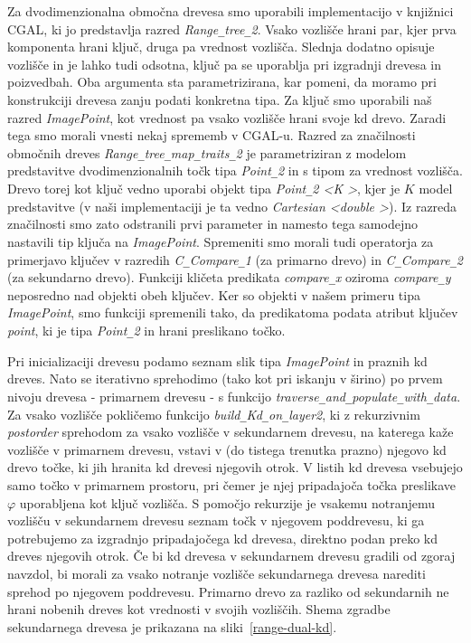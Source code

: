 \documentclass[a4paper, 12pt]{book}
\newcommand{\U}{\texttt{\_}}
\begin{document}
Za dvodimenzionalna območna drevesa smo uporabili implementacijo v knjiž\-ni\-ci CGAL, ki jo predstavlja razred \textit{Range\texttt{\_}tree\texttt{\_}2}. Vsako vozlišče hrani par, kjer prva komponenta hrani ključ, druga pa vrednost vozlišča. Slednja dodatno opisuje vozlišče in je lahko tudi odsotna, ključ pa se uporablja pri izgradnji drevesa in poizvedbah. Oba argumenta sta parametrizirana, kar pomeni, da moramo pri konstrukciji drevesa zanju podati konkretna tipa. 
Za ključ smo uporabili naš razred \textit{ImagePoint}, kot vrednost pa vsako vozlišče hrani svoje kd drevo. Zaradi tega smo morali vnesti nekaj sprememb v CGAL-u. Razred za značilnosti območnih dreves \textit{Range\U tree\U map\U traits\U 2} je parametriziran z modelom predstavitve dvodimenzionalnih točk tipa \textit{Point\U 2} in s tipom za vrednost vozlišča. Drevo torej kot ključ vedno uporabi objekt tipa \textit{Point\U 2 \textless K \textgreater}, kjer je $K$ model predstavitve (v naši implementaciji je ta vedno \textit{Cartesian \textless double \textgreater}). Iz razreda značilnosti smo zato odstranili prvi parameter in namesto tega samodejno nastavili tip ključa na \textit{ImagePoint}. Spremeniti smo morali tudi operatorja za primerjavo ključev v razredih \textit{C\U Compare\U 1} (za primarno drevo) in \textit{C\U Compare\U 2} (za sekundarno drevo). Funkciji kličeta predikata \textit{compare\U x} oziroma \textit{compare\U y} neposredno nad objekti obeh ključev. Ker so objekti v našem primeru tipa \textit{ImagePoint}, smo funkciji spremenili tako, da predikatoma podata atribut ključev \textit{point}, ki je tipa \textit{Point\U 2} in hrani preslikano točko.

Pri inicializaciji drevesu podamo seznam slik tipa \textit{ImagePoint} in praznih kd dreves. Nato se iterativno sprehodimo (tako kot pri iskanju v širino) po prvem nivoju drevesa - primarnem drevesu - s funkcijo \textit{traverse\U and\U popu\-la\-te\U with\U data}. Za vsako vozlišče pokličemo funkcijo \textit{build\U Kd\U on\U la\-yer2}, ki z rekurzivnim \textit{postorder} sprehodom za vsako vozlišče v sekundarnem drevesu, na katerega kaže vozlišče v primarnem drevesu, vstavi v (do tistega trenutka prazno) njegovo kd drevo točke, ki jih hranita kd drevesi njegovih otrok. V listih kd drevesa vsebujejo samo točko v primarnem prostoru, pri čemer je njej pripadajoča točka preslikave $\varphi$ uporabljena kot ključ vozlišča. S pomočjo rekurzije je vsakemu notranjemu vozlišču v sekundarnem drevesu seznam točk v njegovem poddrevesu, ki ga potrebujemo za izgradnjo pripadajočega kd drevesa, direktno podan preko kd dreves njegovih otrok. Če bi kd drevesa v sekundarnem drevesu gradili od zgoraj navzdol, bi morali za vsako notranje vozlišče sekundarnega drevesa narediti sprehod po njegovem poddrevesu. Primarno drevo za razliko od sekundarnih ne hrani nobenih dreves kot vrednosti v svojih vozliščih. Shema zgradbe sekundarnega drevesa je prikazana na sliki~\ref{range-dual-kd}.
\end{document}
